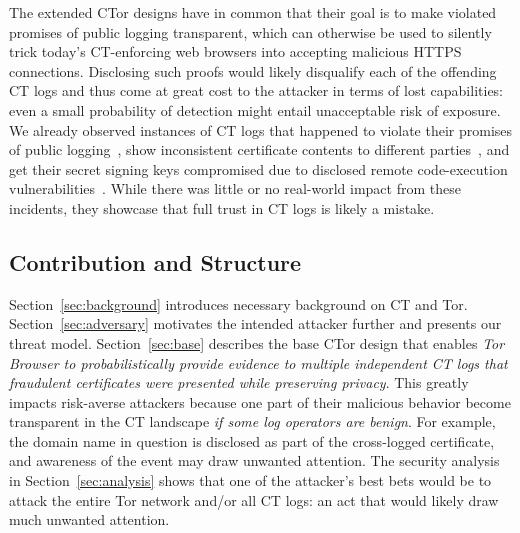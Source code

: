 The extended CTor designs have in common that their goal is to make violated
promises of public logging transparent, which can otherwise be used to silently trick
today's CT-enforcing web browsers into accepting malicious HTTPS connections.
Disclosing such proofs would likely disqualify each of the offending CT logs and
thus come at great cost to the attacker in terms of lost capabilities:
	even a small probability of detection might entail unacceptable risk of
	exposure.
We already observed instances of CT logs that happened to
	violate their promises of public logging~\cite{gdca1-omission},
	show inconsistent certificate contents to different
		parties~\cite{izenpe-disqualified,venafi-disqualified}, and
	get their secret signing keys compromised due to disclosed remote
		code-execution vulnerabilities~\cite{digicert-log-compromised}. 
While there was little or no real-world impact from these incidents, they
showcase that full trust in CT logs is likely a mistake.

\subsection{Contribution and Structure}
Section~\ref{sec:background} introduces necessary background on CT and Tor.
Section~\ref{sec:adversary} motivates the intended attacker further and presents
our threat model.
Section~\ref{sec:base} describes the base CTor design that enables
\emph{Tor Browser to probabilistically provide evidence to multiple
  independent CT logs that fraudulent certificates were presented
  while preserving privacy}.
This greatly impacts risk-averse attackers because one part of their malicious
behavior become transparent in the CT landscape \emph{if some log operators are
benign}.  For example, the domain name in question is disclosed as part of the
cross-logged certificate, and awareness of the event may draw unwanted
attention.  The security analysis in Section~\ref{sec:analysis} shows that one
of the attacker's best bets would be to attack the entire Tor network and/or all
CT logs:
	an act that would likely draw much unwanted attention.

